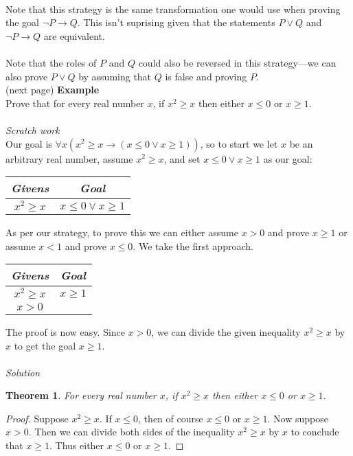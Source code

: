 \documentclass{report}
\newtheorem*{theorem}{Theorem}
\theoremstyle{definition}
\begin{document}
\vspace{1mm}\\
Note that this strategy is the same transformation one would use when proving the goal $\neg P\to Q$. This isn't suprising given that the statements $P\lor Q$ and $\neg P\to Q$ are equivalent.\\
\vspace{1mm}\\
Note that the roles of $P$ and $Q$ could also be reversed in this strategy---we can also prove $P\lor Q$ by assuming that $Q$ is false and proving $P$.\\
(next page)\newpage
\noindent\textbf{Example}\\
Prove that for every real number $x$, if $x^2\geq x$ then either $x\leq0$ or $x\geq1$.\\
\vspace{1mm}\\
\textit{Scratch work}\\
Our goal is $\forall x(x^2\geq x\to(x\leq0\lor x\geq1))$, so to start we let $x$ be an arbitrary real number, assume $x^2\geq x$, and set $x\leq0\lor x\geq1$ as our goal:
\begin{center}
\begin{tabular}{c|c}
\textit{Givens}&\textit{Goal}\\
\hline
$x^2\geq x$&$x\leq0\lor x\geq1$\\
\end{tabular}
\end{center}
As per our strategy, to prove this we can either assume $x>0$ and prove $x\geq1$ or assume $x<1$ and prove $x\leq0$. We take the first approach.
\begin{center}
\begin{tabular}{c|c}
\textit{Givens}&\textit{Goal}\\
\hline
$x^2\geq x$&$x\geq1$\\
$x>0$&
\end{tabular}
\end{center}
The proof is now easy. Since $x>0$, we can divide the given inequality $x^2\geq x$ by $x$ to get the goal $x\geq1$.\\
\vspace{1mm}\\
\textit{Solution}
\begin{theorem}
For every real number $x$, if $x^2\geq x$ then either $x\leq0$ or $x\geq1$.
\end{theorem}
\begin{proof}
Suppose $x^2\geq x$. If $x\leq0$, then of course $x\leq0$ or $x\geq1$. Now suppose $x>0$. Then we can divide both sides of the inequality $x^2\geq x$ by $x$ to conclude that $x\geq 1$. Thus either
$x\leq0$ or $x\geq1$.
\end{proof}
\newpage
\end{document}
